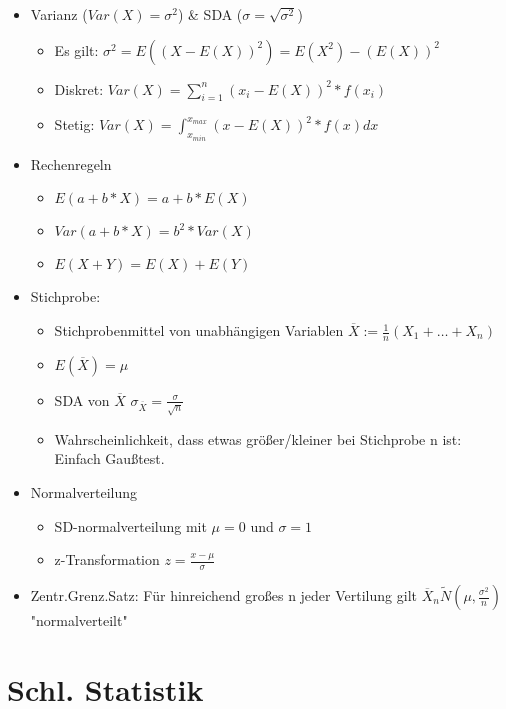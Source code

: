 \documentclass[a4paper]{article}
\begin{document}
\begin{landscape}
\begin{multicols}{4}
\begin{itemize}[noitemsep,nolistsep,leftmargin=*]
        \item Varianz ($Var(X) = \sigma^2$) \& SDA ($\sigma = \sqrt{\sigma^2}$)
        \begin{itemize}[noitemsep,nolistsep,leftmargin=*]
            \item Es gilt: $\sigma^2 = E((X-E(X))^2) = E(X^2)- (E(X))^2$
            \item Diskret: $Var(X) = \sum^n_{i=1} (x_i-E(X))^2 * f(x_i)$
            \item Stetig: $Var(X) = \int^{x_{max}}_{x_{min}} (x-E(X))^2 * f(x) dx$
        \end{itemize}
        \item Rechenregeln
        \begin{itemize}[noitemsep,nolistsep,leftmargin=*]
            \item $E(a+b*X) = a + b* E(X)$
            \item $Var(a+b*X) = b^2 * Var(X)$
            \item $E(X+Y) = E(X) + E(Y)$
        \end{itemize}
        \item Stichprobe:
        \begin{itemize}[noitemsep,nolistsep,leftmargin=*]
            \item Stichprobenmittel von unabhängigen Variablen $\overline{X} := \frac{1}{n} (X_1 + \dots + X_n)$
            \item $E(\overline{X}) = \mu$ 
            \item SDA von $\overline{X}$ $\sigma_{\overline{X}} = \frac{\sigma}{\sqrt{n}}$
            \item Wahrscheinlichkeit, dass etwas größer/kleiner bei Stichprobe n ist: Einfach Gaußtest. 
        \end{itemize}
        \item Normalverteilung
        \begin{itemize}[noitemsep,nolistsep,leftmargin=*]
            \item SD-normalverteilung mit $\mu = 0$ und $\sigma = 1$
            \item z-Transformation $z = \frac{x-\mu}{\sigma}$
        \end{itemize}
        \item Zentr.Grenz.Satz: Für hinreichend großes n jeder Vertilung gilt $\overline{X}_n \tilde N(\mu, \frac{\sigma^2}{n}) $ "normalverteilt"
    \end{itemize}


    \section{Schl. Statistik}

\end{multicols}
\end{landscape}
\end{document}
